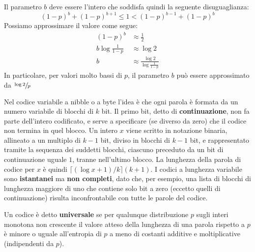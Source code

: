 \documentclass[\main/main.tex]{subfiles}
\begin{document}
\begin{multicols}{2}
\begin{analysis}
    Il parametro \(b\) deve essere l'intero che soddisfa quindi la seguente disuguaglianza:
    \[(1-p)^{b}+(1-p)^{b+1} \leq 1<(1-p)^{b-1}+(1-p)^{b}\]
    Possiamo approssimare il valore come segue:
    \[
        \begin{aligned}(1-p)^{b} & \approx \frac{1}{2} \\ b \log \frac{1}{1-p} & \approx \log 2 \\ b & \approx \frac{\log 2}{\log \frac{1}{1-p}} \end{aligned}
    \]
    In particolare, per valori molto bassi di \(p\), il parametro \(b\) può essere approssimato da \(\sfrac{\log 2}{p}\)
\end{analysis}
\begin{definition}
    Nel codice variabile a nibble o a byte l'idea è che ogni parola è formata da un numero variabile di blocchi di \(k\) bit. Il primo bit, detto di \textbf{continuazione}, non fa parte dell'intero codificato, e serve a specificare (se diverso da zero) che il codice non termina in quel blocco. Un intero \(x\) viene scritto in notazione binaria, allineato a un multiplo di \(k-1\) bit, diviso in blocchi di \(k-1\) bit, e rappresentato tramite la sequenza dei suddetti blocchi, ciascuno preceduto da un bit di continuazione uguale \(1\), tranne nell'ultimo blocco. La lunghezza della parola di codice per \(x\) è quindi \(\lceil(\log x+1) / k\rceil(k+1)\). I codici a lunghezza variabile sono \textbf{istantanei} ma \textbf{non completi}, dato che, per esempio, una lista di blocchi di lunghezza maggiore di uno che contiene solo bit a zero (eccetto quelli di continuazione) risulta inconfrontabile con tutte le parole del codice.
\end{definition}
\begin{property}
    Un codice è detto \textbf{universale} se per qualunque distribuzione \(p\) sugli interi monotona non crescente il valore atteso della lunghezza di una parola rispetto a \(p\) è minore o uguale all'entropia di \(p\) a meno di costanti additive e moltiplicative (indipendenti da \(p\)).
    

\end{property}
\end{multicols}
\end{document}
